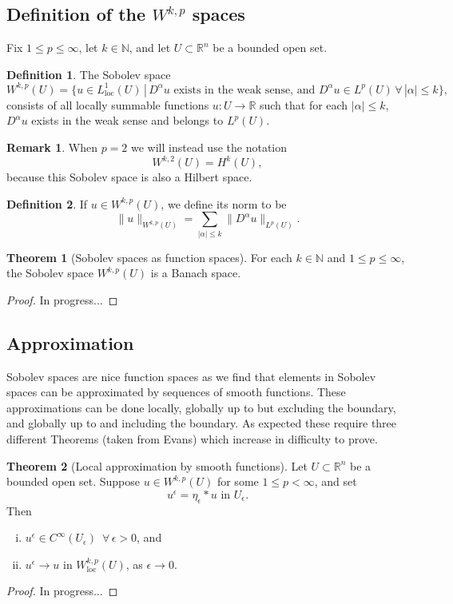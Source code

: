 \documentclass[11pt]{article}
\theoremstyle{definition}
\newtheorem*{theorem}{Theorem}
\newtheorem*{definition}{Definition}
\newtheorem*{remark}{Remark}
\begin{document}
\newpage

\subsection{Definition of the $W^{k,p}$ spaces}
Fix $1 \leq p \leq \infty$, let $k \in \mathbb{N}$, and let $U \subset \mathbb{R}^n$ be a bounded open set.
\begin{definition}
	The Sobolev space
	\[W^{k,p}(U) = \{u \in L^1_{\text{loc}}(U) \, | \, D^{\alpha}u \text{ exists in the weak sense, and } D^{\alpha}u \in L^p(U) \, \forall \, |\alpha| \leq k\},\]
	consists of all locally summable functions $u : U \rightarrow \mathbb{R}$ such that for each $|\alpha| \leq k$, $D^{\alpha}u$ exists in the weak sense
	and belongs to $L^p(U)$.
\end{definition}
\begin{remark}
	When $p=2$ we will instead use the notation
	\[W^{k,2}(U) = H^k(U),\]
	because this Sobolev space is also a Hilbert space.
\end{remark}
\begin{definition}
	If $u \in W^{k,p}(U)$, we define its norm to be
	\[\|u\|_{W^{k,p}(U)} = \sum_{|\alpha| \leq k} \|D^{\alpha}u\|_{L^p(U)}.\]
\end{definition}
\begin{theorem}[Sobolev spaces as function spaces]
	For each $k \in \mathbb{N}$ and $1 \leq p \leq \infty$, the Sobolev space $W^{k,p}(U)$ is a Banach space.
\end{theorem}
\begin{proof}
	In progress...
\end{proof}

\newpage

\subsection{Approximation}
Sobolev spaces are nice function spaces as we find that elements in Sobolev spaces can be approximated by sequences of smooth functions.
These approximations can be done locally, globally up to but excluding the boundary, and globally up to and including the boundary.
As expected these require three different Theorems (taken from Evans) which increase in difficulty to prove.

\begin{theorem}[Local approximation by smooth functions]
Let $U \subset \mathbb{R}^n$ be a bounded open set. Suppose $u \in W^{k,p}(U)$ for some $1 \leq p < \infty$, and set
	\[u^{\epsilon} = \eta_{\epsilon} * u \text{ in } U_{\epsilon}.\]
Then
	\begin{enumerate}[(i)]
		\item $u^{\epsilon} \in C^{\infty}(U_{\epsilon}) \,\,\, \forall \, \epsilon > 0$, and
		\item $u^{\epsilon} \rightarrow u \text{ in } W_{\text{loc}}^{k,p}(U)$, as $\epsilon \rightarrow 0$.
	\end{enumerate}
\end{theorem}
\begin{proof}
In progress...
\end{proof}
\end{document}
